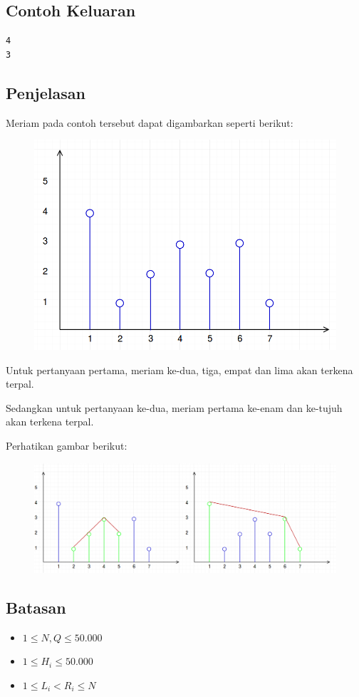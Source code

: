 \documentclass{article}
\begin{document}
\subsection*{Contoh Keluaran}

\begin{lstlisting}
4
3
\end{lstlisting}

\subsection*{Penjelasan}

\par\noindent Meriam pada contoh tersebut dapat digambarkan seperti berikut:

\begin{figure}[h!]
	\centering
	\includegraphics[width=0.4\linewidth]{meriam_sample1.png}
\end{figure}

\par\noindent Untuk pertanyaan pertama, meriam ke-dua, tiga, empat dan lima akan terkena terpal.
\par\noindent Sedangkan untuk pertanyaan ke-dua, meriam pertama ke-enam dan ke-tujuh akan terkena terpal.
\par\noindent Perhatikan gambar berikut:

\begin{figure}[h!]
	\centering
	\includegraphics[width=0.7\linewidth]{meriam_sample2.png}
\end{figure}

\subsection*{Batasan}

\begin{itemize}
	\item $1 \leq N, Q \leq 50.000$
	\item $1 \leq H_i \leq 50.000$
	\item $1 \leq L_i < R_i \leq N$
\end{itemize}
\end{document}
